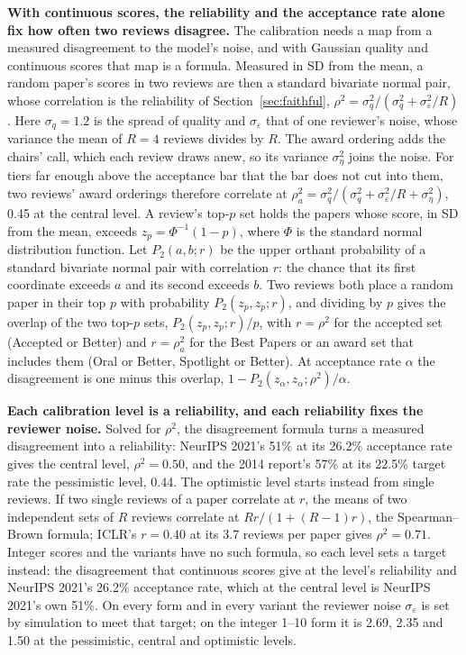 \documentclass{article}
\begin{document}
\textbf{With continuous scores, the reliability and the acceptance rate alone fix how often two reviews disagree.} The calibration needs a map from a measured disagreement to the model's noise, and with Gaussian quality and continuous scores that map is a formula. Measured in SD from the mean, a random paper's scores in two reviews are then a standard bivariate normal pair, whose correlation is the reliability of Section~\ref{sec:faithful}, $\rho^2=\sigma_q^2/(\sigma_q^2+\sigma_\varepsilon^2/R)$. Here $\sigma_q=1.2$ is the spread of quality and $\sigma_\varepsilon$ that of one reviewer's noise, whose variance the mean of $R=4$ reviews divides by $R$. The award ordering adds the chairs' call, which each review draws anew, so its variance $\sigma_\eta^2$ joins the noise. For tiers far enough above the acceptance bar that the bar does not cut into them, two reviews' award orderings therefore correlate at $\rho_a^2=\sigma_q^2/(\sigma_q^2+\sigma_\varepsilon^2/R+\sigma_\eta^2)$, 0.45 at the central level. A review's top-$p$ set holds the papers whose score, in SD from the mean, exceeds $z_p=\Phi^{-1}(1-p)$, where $\Phi$ is the standard normal distribution function. Let $P_2(a,b;r)$ be the upper orthant probability of a standard bivariate normal pair with correlation $r$: the chance that its first coordinate exceeds $a$ and its second exceeds $b$. Two reviews both place a random paper in their top $p$ with probability $P_2(z_p,z_p;r)$, and dividing by $p$ gives the overlap of the two top-$p$ sets, $P_2(z_p,z_p;r)/p$, with $r=\rho^2$ for the accepted set (Accepted or Better) and $r=\rho_a^2$ for the Best Papers or an award set that includes them (Oral or Better, Spotlight or Better). At acceptance rate $\alpha$ the disagreement is one minus this overlap, $1-P_2(z_\alpha,z_\alpha;\rho^2)/\alpha$.

\textbf{Each calibration level is a reliability, and each reliability fixes the reviewer noise.} Solved for $\rho^2$, the disagreement formula turns a measured disagreement into a reliability: NeurIPS 2021's 51\% at its 26.2\% acceptance rate gives the central level, $\rho^2=0.50$, and the 2014 report's 57\% at its 22.5\% target rate the pessimistic level, 0.44. The optimistic level starts instead from single reviews. If two single reviews of a paper correlate at $r$, the means of two independent sets of $R$ reviews correlate at $Rr/(1+(R-1)r)$, the Spearman--Brown formula; ICLR's $r=0.40$ at its 3.7 reviews per paper gives $\rho^2=0.71$. Integer scores and the variants have no such formula, so each level sets a target instead: the disagreement that continuous scores give at the level's reliability and NeurIPS 2021's 26.2\% acceptance rate, which at the central level is NeurIPS 2021's own 51\%. On every form and in every variant the reviewer noise $\sigma_\varepsilon$ is set by simulation to meet that target; on the integer 1--10 form it is 2.69, 2.35 and 1.50 at the pessimistic, central and optimistic levels.
\end{document}
